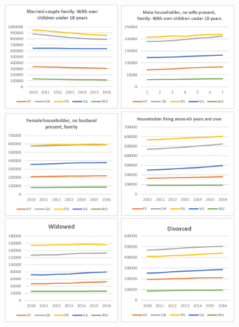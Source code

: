 \documentclass[12pt]{article}
\begin{document}
\begin{figure}[!htbp]
\small
\centering
\includegraphics[width=5cm]{Fig/1}
\includegraphics[width=5cm]{Fig/2}
\includegraphics[width=5cm]{Fig/3}
\includegraphics[width=5cm]{Fig/4}
\includegraphics[width=5cm]{Fig/5}
\includegraphics[width=5cm]{Fig/6}

\end{figure}
\end{document}
